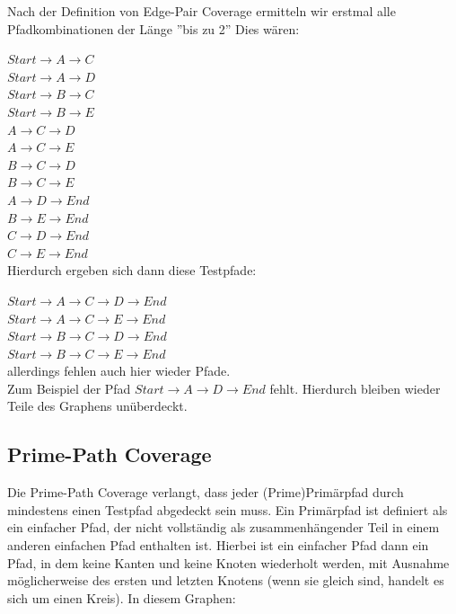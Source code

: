 Nach der Definition von Edge-Pair Coverage ermitteln wir erstmal alle Pfadkombinationen der Länge ''bis zu 2''
Dies wären:

$Start \rightarrow A \rightarrow C$ \\
$Start \rightarrow A \rightarrow D$ \\
$Start \rightarrow B \rightarrow C$ \\
$Start \rightarrow B \rightarrow E$ \\
$A \rightarrow C \rightarrow D$ \\
$A \rightarrow C \rightarrow E$ \\
$B \rightarrow C \rightarrow D$ \\
$B \rightarrow C \rightarrow E$ \\
$A \rightarrow D \rightarrow End$ \\
$B \rightarrow E \rightarrow End$ \\
$C \rightarrow D \rightarrow End$ \\
$C \rightarrow E \rightarrow End$ \\

Hierdurch ergeben sich dann diese Testpfade:

$Start \rightarrow  A \rightarrow  C \rightarrow  D \rightarrow  End$ \\
$Start \rightarrow  A \rightarrow  C \rightarrow  E \rightarrow  End$ \\
$Start \rightarrow  B \rightarrow  C \rightarrow  D \rightarrow  End$ \\
$Start \rightarrow  B \rightarrow  C \rightarrow  E \rightarrow  End$ \\

allerdings fehlen auch hier wieder Pfade. \\
Zum Beispiel der Pfad $Start \rightarrow A \rightarrow D \rightarrow End$ fehlt.
Hierdurch bleiben wieder Teile des Graphens unüberdeckt.

\subsection{Prime-Path Coverage}

Die Prime-Path Coverage verlangt, dass jeder (Prime)Primärpfad durch mindestens einen Testpfad abgedeckt sein muss.
Ein Primärpfad ist definiert als ein einfacher Pfad, der nicht vollständig als zusammenhängender Teil in einem anderen einfachen Pfad enthalten ist. \cite[vgl. S. 35]{software-testing}
Hierbei ist ein einfacher Pfad dann  ein Pfad, in dem keine Kanten und keine Knoten wiederholt werden,
mit Ausnahme möglicherweise des ersten und letzten Knotens (wenn sie gleich sind, handelt es sich um einen Kreis).
In diesem Graphen:

